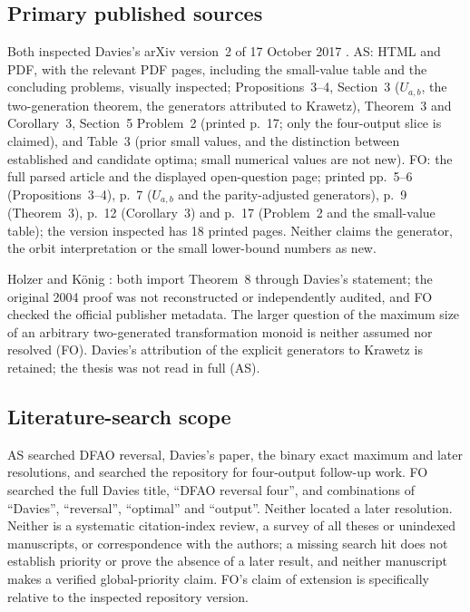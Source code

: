 \documentclass[11pt,a4paper]{article}
\numberwithin{equation}{section}
\theoremstyle{definition}
\theoremstyle{remark}
\begin{document}
\subsection{Primary published sources}

Both inspected Davies's arXiv version~2 of 17 October 2017 \cite{Davies2017}.
AS: HTML and PDF, with the relevant PDF pages, including the small-value table
and the concluding problems, visually inspected; Propositions~3--4, Section~3
($U_{a,b}$, the two-generation theorem, the generators attributed to Krawetz),
Theorem~3 and Corollary~3, Section~5 Problem~2 (printed p.~17; only the
four-output slice is claimed), and Table~3 (prior small values, and the
distinction between established and candidate optima; small numerical values
are not new). FO: the full parsed article and the displayed open-question page;
printed pp.~5--6 (Propositions~3--4), p.~7 ($U_{a,b}$ and the parity-adjusted
generators), p.~9 (Theorem~3), p.~12 (Corollary~3) and p.~17 (Problem~2 and the
small-value table); the version inspected has 18 printed pages. Neither claims
the generator, the orbit interpretation or the small lower-bound numbers as
new.

Holzer and K\"onig \cite{HolzerKoenig2004}: both import Theorem~8 through
Davies's statement; the original 2004 proof was not reconstructed or
independently audited, and FO checked the official publisher metadata. The
larger question of the maximum size of an arbitrary two-generated
transformation monoid is neither assumed nor resolved (FO). Davies's
attribution of the explicit generators to Krawetz \cite{Krawetz2003} is
retained; the thesis was not read in full (AS).

\subsection{Literature-search scope}

AS searched DFAO reversal, Davies's paper, the binary exact maximum and later
resolutions, and searched the repository for four-output follow-up work. FO
searched the full Davies title, ``DFAO reversal four'', and combinations of
``Davies'', ``reversal'', ``optimal'' and ``output''. Neither located a later
resolution. Neither is a systematic citation-index review, a survey of all
theses or unindexed manuscripts, or correspondence with the authors; a missing
search hit does not establish priority or prove the absence of a later
result, and neither manuscript makes a verified global-priority claim. FO's
claim of extension is specifically relative to the inspected repository
version.
\end{document}
